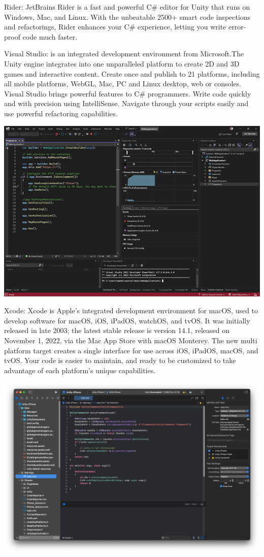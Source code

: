 \documentclass[12pt]{report}
\begin{document}
Rider: JetBrains Rider is a fast and powerful C\# editor for Unity that runs on Windows, Mac, and Linux. With the unbeatable 2500+ smart code inspections and refactorings, Rider enhances your C\# experience, letting you write error-proof code much faster.

Visual Studio: is an integrated development environment from Microsoft.The Unity engine integrates into one unparalleled platform to create 2D and 3D games and interactive content. Create once and publish to 21 platforms, including all mobile platforms, WebGL, Mac, PC and Linux desktop, web or consoles. Visual Studio brings powerful features to C\# programmers. Write code quickly and with precision using IntelliSense. Navigate through your scripts easily and use powerful refactoring capabilities.

\includegraphics[scale=0.6]{image7.png}

Xcode: Xcode is Apple's integrated development environment for macOS, used to develop software for macOS, iOS, iPadOS, watchOS, and tvOS. It was initially released in late 2003; the latest stable release is version 14.1, released on November 1, 2022, via the Mac App Store with macOS Monterey. The new multi platform target creates a single interface for use across iOS, iPadOS, macOS, and tvOS. Your code is easier to maintain, and ready to be customized to take advantage of each platform’s unique capabilities.

\includegraphics[scale=0.2]{image8.png}
\end{document}
